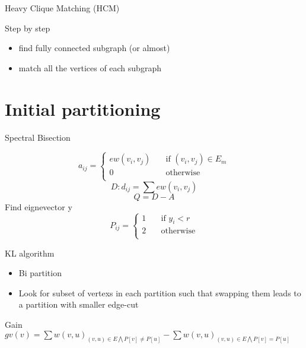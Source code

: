 \documentclass{beamer}
\begin{document}
	
	\begin{frame}{Heavy Clique Matching (HCM)}
		\begin{block}{Step by step}
			\begin{itemize}
				\item find fully connected subgraph (or almost)
				\item match all the vertices of each subgraph
			\end{itemize}
		\end{block}
	\end{frame}
	\author[W.~Pei]{Q.~Diaferia \and T.~Levasseur \and W.~Pei \and G.~Perez Bada}
	\section{Initial partitioning}
	
	\begin{frame}{Spectral Bisection}
		
		\[a_{ij} =
		\begin{cases}
		ew(v_{i},v_{j})     & \quad \text{if } (v_{i},v_{j})  \in E_{m}\\
		0 & \quad \text{otherwise}\\
		\end{cases}
		\]
		\[ D: d_{ij} = \sum ew(v_{i},v_{j}) \]
		\[ Q = D-A \]
		Find eignevector y
		\[ P_{ij} =
		\begin{cases}
		1    & \quad \text{if } y_{i} < r \\
		2 & \quad \text{otherwise}\\
		\end{cases}
		\]
	\end{frame}
	
	
	
	\begin{frame}{KL algorithm}
		\begin{itemize}
			\item Bi partition
			\item Look for subset of vertexs in each partition such that swapping them leads to a partition with smaller edge-cut
		\end{itemize}
		\begin{block}{Gain}
			$gv(v) = \sum w(v,u)_{(v,u)\in E\bigwedge P[v]\neq P[u]} - \sum w(v,u)_{(v,u)\in E\bigwedge P[v]= P[u] }$
		\end{block}
	\end{frame}
	
	
	
	
	
\end{document}
